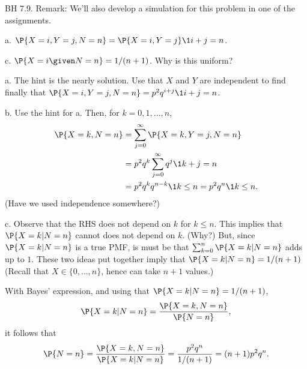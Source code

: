 

\setcounter{theorem}{8}
\begin{exercise} BH 7.9.
Remark: We'll also develop a simulation for this problem in one of the assignments.
\begin{hint}
a. $\P{X=i, Y=j, N=n} = \P{X=i, Y=j} \1{i+j=n}$.

c. $\P{X=i\given N=n} = 1/(n+1)$. Why is this uniform?
\end{hint}
\begin{solution}
a. The hint is the nearly solution. Use that $X$ and $Y$ are independent to find finally that $\P{X=i, Y=j, N=n} = p^{2} q^{i+j} \1{i+j=n}$.

b. Use the hint for a. Then, for $k=0, 1, \ldots, n$,
\begin{align*}
\P{X=k, N=n}
  &= \sum_{j=0}^{\infty} \P{X=k, Y=j, N=n} \\
  &= p^{2} q^{k}\sum_{j=0}^{\infty} q^{j} \1{k+j=n} \\
  &= p^{2} q^{k} q^{n-k}  \1{k \leq n}  = p^{2}  q^{n}  \1{k \leq n}.
\end{align*}
(Have we used independence somewhere?)

c.
Observe that the RHS does not depend on $k$ for $k\leq n$.
This implies that $\P{X=k|N=n}$ cannot  does not depend on $k$. (Why?)
But, since $\P{X=k|N=n}$ is a true PMF, is must be that $\sum_{k=0}^{n}\P{X=k|N=n}$ adds up to $1$.
These two ideas put together imply that $\P{X=k|N=n} = 1/(n+1)$ (Recall that $X\in \{0, \ldots, n\}$, hence can take $n+1$ values.)

With Bayes' expression, and using that  $\P{X=k|N=n} = 1/(n+1)$,
\begin{equation*}
\P{X=k|N=n} = \frac{\P{X=k, N=n}}{\P{N=n}},
\end{equation*}
it follows that
\begin{equation*}
\P{N=n} = \frac{\P{X=k, N=n}}{\P{X=k|N=n}} = \frac{p^2q^n}{1/(n+1)} = (n+1) p^2q^{n}.
\end{equation*}
\end{solution}
\end{exercise}



